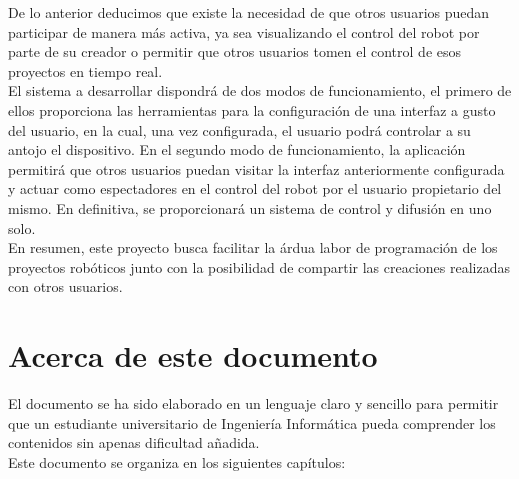 De lo anterior deducimos que existe la necesidad de que otros usuarios puedan participar de manera más activa, ya sea visualizando el control del robot por parte de su creador o permitir que otros usuarios
tomen el control de esos proyectos en tiempo real.\\

El sistema a desarrollar dispondrá de dos modos de funcionamiento, el primero de ellos proporciona las herramientas para la configuración de una interfaz a gusto del usuario, en la cual, 
una vez configurada, el usuario podrá controlar a su antojo el dispositivo. En el segundo modo de funcionamiento, la aplicación permitirá que otros usuarios puedan visitar la interfaz anteriormente 
configurada y actuar como espectadores en el control del robot por el usuario propietario del mismo. En definitiva, se proporcionará un sistema de control y difusión en uno solo.\\


En resumen, este proyecto busca facilitar la árdua labor de programación de los proyectos robóticos junto con la posibilidad de compartir las creaciones realizadas con otros usuarios.\\


\section{Acerca de este documento}

El documento se ha sido elaborado en un lenguaje claro y sencillo para permitir que un estudiante universitario de Ingeniería Informática pueda comprender los contenidos sin apenas dificultad añadida.\\

Este documento se organiza en los siguientes capítulos:\\


